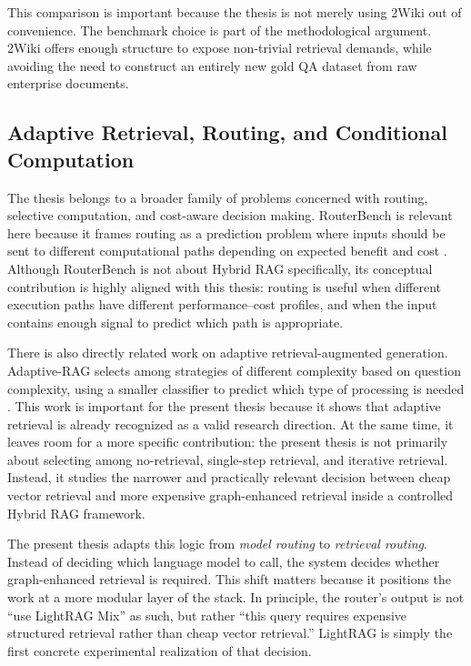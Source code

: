 \documentclass[11pt, a4paper]{article}
\begin{document}
This comparison is important because the thesis is not merely using 2Wiki out of convenience. The benchmark choice is part of the methodological argument. 2Wiki offers enough structure to expose non-trivial retrieval demands, while avoiding the need to construct an entirely new gold QA dataset from raw enterprise documents.

\subsection{Adaptive Retrieval, Routing, and Conditional Computation}

The thesis belongs to a broader family of problems concerned with routing, selective computation, and cost-aware decision making. RouterBench is relevant here because it frames routing as a prediction problem where inputs should be sent to different computational paths depending on expected benefit and cost \cite{hu2024routerbench}. Although RouterBench is not about Hybrid RAG specifically, its conceptual contribution is highly aligned with this thesis: routing is useful when different execution paths have different performance--cost profiles, and when the input contains enough signal to predict which path is appropriate.

There is also directly related work on adaptive retrieval-augmented generation. Adaptive-RAG selects among strategies of different complexity based on question complexity, using a smaller classifier to predict which type of processing is needed \cite{jeong2024adaptiverag}. This work is important for the present thesis because it shows that adaptive retrieval is already recognized as a valid research direction. At the same time, it leaves room for a more specific contribution: the present thesis is not primarily about selecting among no-retrieval, single-step retrieval, and iterative retrieval. Instead, it studies the narrower and practically relevant decision between cheap vector retrieval and more expensive graph-enhanced retrieval inside a controlled Hybrid RAG framework.

The present thesis adapts this logic from \emph{model routing} to \emph{retrieval routing}. Instead of deciding which language model to call, the system decides whether graph-enhanced retrieval is required. This shift matters because it positions the work at a more modular layer of the stack. In principle, the router's output is not ``use LightRAG Mix'' as such, but rather ``this query requires expensive structured retrieval rather than cheap vector retrieval.'' LightRAG is simply the first concrete experimental realization of that decision.
\end{document}
